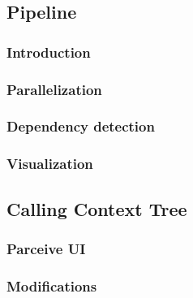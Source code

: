 \subsection{Pipeline}
\subsubsection{Introduction}
\subsubsection{Parallelization}
\subsubsection{Dependency detection}
\subsubsection{Visualization}

\subsection{Calling Context Tree}
\subsubsection{Parceive UI}
\subsubsection{Modifications}





